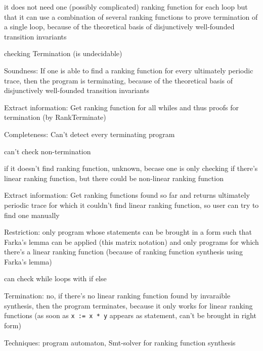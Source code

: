 \documentclass[a4paper]{article}
\begin{document}
\begin{minipage}[t]{0.16\linewidth}
\begin{betterlist}
{{\begin{betterlist}
					\codeone
					\codetwo
					\item it does not need one (possibly complicated) ranking function for each loop but that it can use a combination of several ranking functions to prove termination of a single loop, because of the theoretical basis of disjunctively well-founded transition invariants
					\item checking Termination (is undecidable)
					\item \alert{Soundness:} If one is able to find a ranking function for every ultimately periodic trace, then the program is terminating, because of the theoretical basis of disjunctively well-founded transition invariants
					\begin{betterlist}
						\item \alert{Extract information:} Get ranking function for all whiles and thus proofs for termination (by RankTerminate)
					\end{betterlist}
					\item \alert{Completeness:} Can't detect every terminating program
					\begin{betterlist}
						\item can't check non-termination
						\item if it doesn't find ranking function, unknown, becase one is only checking if there's linear ranking function, but there could be non-linear ranking function
						\item \alert{Extract information:} Get ranking functions found so far and returns ultimately periodic trace for which it couldn't find linear ranking function, so user can try to find one manually
					\end{betterlist}
					\item \alert{Restriction:} only program whose statements can be brought in a form such that Farka's lemma can be applied (this matrix notation) and only programs for which there's a linear ranking function (because of ranking function synthesis using Farka's lemma)
					\begin{betterlist}
						\item can check while loops with if else
					\end{betterlist}
					\item \alert{Termination:} no, if there's no linear ranking function found by invaraible synthesis, then the program terminates, because it only works for linear ranking functions (as soon as \texttt{x := x * y} appears as statement, can't be brought in right form)
					\item \alert{Techniques:} program automaton, Smt-solver for ranking function synthesis

\end{betterlist}}}
\end{betterlist}
\end{minipage}
\end{document}
